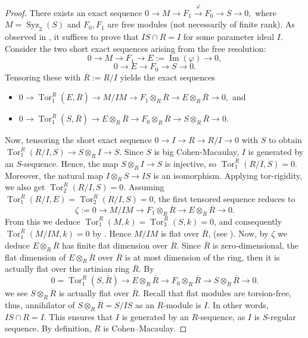 \documentclass[10pt,a4paper]{amsart}
\numberwithin{equation}{section}
\newcommand{\Syz}{\operatorname{Syz}}
\begin{document}
\begin{proof}
 There exists an exact sequence
$
	0 \to M \to F_1 \xrightarrow{\varphi} F_0 \to  S \to 0,
$
	where \(M=\Syz_2(S)\) and \(F_0,F_1\) are free modules (not necessarily of finite rank). As observed in \cite[2.5]{sc1}, it suffices to prove that \(IS\cap R=I\) for some parameter ideal \(I\). 
Consider the two short exact sequences arising from the free resolution:
	\[
	0 \longrightarrow M \longrightarrow F_1 \longrightarrow E:=\operatorname{Im}(\varphi) \longrightarrow 0,
	\]
	\[
	0 \longrightarrow E \longrightarrow F_0 \longrightarrow S \longrightarrow 0.
	\]
	Tensoring these with \(\overline{R}:=R/I\) yields the exact sequences

\begin{itemize}
	\item[(i)]
 \(0 \longrightarrow \operatorname{Tor}_1^R(E,\overline{R}) \longrightarrow M/IM \longrightarrow F_1\otimes_R \overline{R} \longrightarrow E\otimes_R \overline{R} \longrightarrow 0,\) and
 \item[(ii)]	
	\(	0 \longrightarrow \operatorname{Tor}_1^R(S,\overline{R}) \longrightarrow E\otimes_R \overline{R} \longrightarrow F_0\otimes_R \overline{R} \longrightarrow S\otimes_R \overline{R} \longrightarrow 0.
	\) 
\end{itemize}

Now, tensoring the short exact sequence \(0\to I\to R\to R/I\to 0\) with \(S\) to obtain
$
	\operatorname{Tor}_1^R(R/I,S) \to S\otimes_R I \to S.
$
	Since \(S\) is big Cohen-Macaulay, $I$ is generated by an $S$-sequence. Hence, the map \(S\otimes_R I\to S\) is injective, so \(\operatorname{Tor}_1^R(R/I,S)=0\). Moreover, the natural map \(I\otimes_R S\to IS\) is an isomorphism. Applying tor-rigidity, we also get \(\operatorname{Tor}_2^R(R/I,S)=0\). Assuming \(\operatorname{Tor}_1^R(R/I,E)=\operatorname{Tor}_2^R(R/I,S)=0\), the first tensored sequence reduces to
	\[
\zeta:=	0\longrightarrow M/IM \longrightarrow F_1\otimes_R \overline{R} \longrightarrow E\otimes_R \overline{R} \longrightarrow 0.
	\]
	From this we deduce \(\operatorname{Tor}_1^R(M,k)=\operatorname{Tor}_3^R(S,k)=0\), and consequently \(\operatorname{Tor}_1^{\overline{R}}(M/IM,k)=0\) by \cite[2.1]{sc1}. Hence \(M/IM\) is flat over \(\overline{R}\), (see \cite[22.3]{mat}). Now, by $\zeta$	we deduce \(E\otimes_R \overline{R}\) has finite flat dimension over \(\overline{R}\).
	Since \(\overline{R}\) is zero-dimensional, the flat dimension of \(E\otimes_R \overline{R}\) over \(\overline{R}\) is at most dimension of the ring, then it is actually flat over the artinian ring \(\overline{R}\). 
By 		\[
0 = \operatorname{Tor}_1^R(S,\overline{R}) \longrightarrow E\otimes_R \overline{R} \longrightarrow F_0\otimes_R \overline{R} \longrightarrow S\otimes_R \overline{R} \longrightarrow 0.
\]
we see $S\otimes_R \overline{R}$
is actually flat over   \(\overline{R}\).  Recall that flat modules are torsion-free, thus, annihilator
of $S\otimes_R \overline{R}=S/IS$
as an $R$-module is $I$.
In other words, \(IS\cap R=I\). This ensures that \(I\) is generated by an \(R\)-sequence, as
\(I\) is $S$-regular sequence.
By definition, \(R\) is Cohen--Macaulay.
\end{proof}
\end{document}
